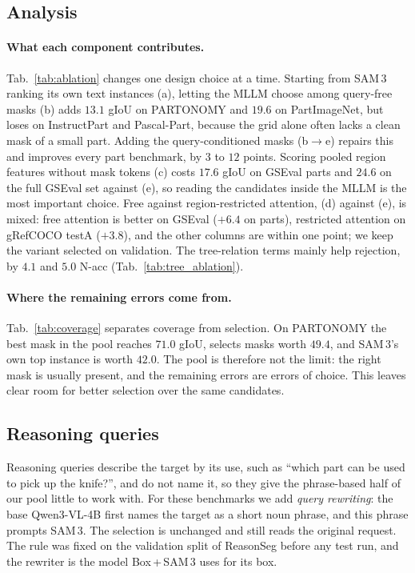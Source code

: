 \subsection{Analysis}
\label{sec:analysis}

\paragraph{What each component contributes.}
Tab.~\ref{tab:ablation} changes one design choice at a time. Starting from SAM\,3 ranking its own text instances
(a), letting the MLLM choose among query-free masks (b) adds $13.1$ gIoU on PARTONOMY and $19.6$ on PartImageNet,
but loses on InstructPart and Pascal-Part, because the grid alone often lacks a clean mask of a small part. Adding
the query-conditioned masks (b$\rightarrow$e) repairs this and improves every part benchmark, by $3$ to $12$
points. Scoring pooled region features without mask tokens (c) costs $17.6$ gIoU on GSEval parts and $24.6$ on the
full GSEval set against (e), so reading the candidates inside the MLLM is the most important choice. Free
against region-restricted attention, (d) against (e), is mixed: free attention is better on GSEval ($+6.4$ on
parts), restricted attention on gRefCOCO testA ($+3.8$), and the other columns are within one point; we keep the
variant selected on validation. The tree-relation terms mainly help rejection, by $4.1$ and $5.0$ N-acc
(Tab.~\ref{tab:tree_ablation}).

\paragraph{Where the remaining errors come from.}
Tab.~\ref{tab:coverage} separates coverage from selection. On PARTONOMY the best mask in the pool reaches $71.0$
gIoU, \ours{} selects masks worth $49.4$, and SAM\,3's own top instance is worth $42.0$. The pool is therefore not
the limit: the right mask is usually present, and the remaining errors are errors of choice. This leaves clear
room for better selection over the same candidates.

\subsection{Reasoning queries}
\label{sec:reasoning}

Reasoning queries describe the target by its use, such as ``which part can be used to pick up the knife?'', and do
not name it, so they give the phrase-based half of our pool little to work with. For these benchmarks we add
\emph{query rewriting}: the base Qwen3-VL-4B first names the target as a short noun phrase, and this phrase
prompts SAM\,3. The selection is unchanged and still reads the original request. The rule was fixed on the
validation split of ReasonSeg before any test run, and the rewriter is the model Box\,+\,SAM\,3 uses for its box.

